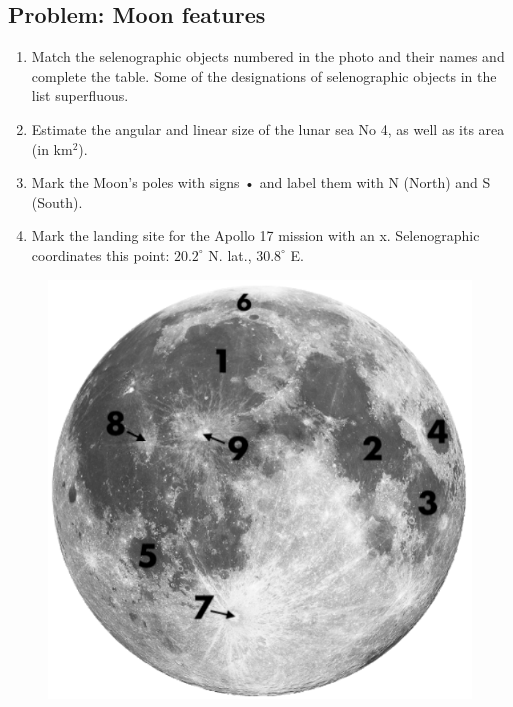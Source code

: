 \documentclass[a4paper,12pt]{extarticle}
\begin{document}
\subsection{Problem: Moon features }
\begin{enumerate}
	\item Match the selenographic objects numbered in the photo and their names and complete the table. Some of the designations of selenographic objects in the list superfluous.
	\item Estimate the angular and linear size of the lunar sea No 4, as well as its area (in km$^2$).
	\item Mark the Moon's poles with signs • and label them with N (North) and S (South).
	\item Mark the landing site for the Apollo 17 mission with an x. Selenographic coordinates this point: $20.2^\circ$ N. lat., $30.8^\circ$ E.
\end{enumerate}
\begin{figure}[H]
	\centering
	\includegraphics[width=0.8\linewidth]{moon2.png}
\end{figure}
\end{document}
